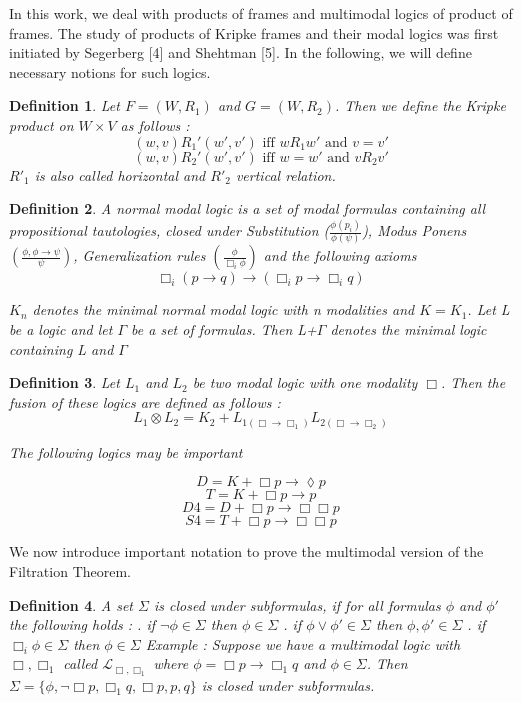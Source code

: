 \documentclass[12pt, a4paper]{scrartcl}
\newtheorem{definition}{Definition}[subsection]
\begin{document}
In this work, we deal with products of frames and multimodal logics of product of frames. The study of products of Kripke frames 
and their modal logics was first initiated by Segerberg [4] and Shehtman [5]. In the following, we will define necessary notions for such logics.

\begin{definition}
    Let $F = (W, R_1)$ and $G = (W,R_2)$. Then we define the Kripke product on $W \times V$ as follows : 
    $$(w,v)R_1'(w',v') \mbox{ iff } wR_1w' \mbox{ and } v = v'$$
    $$(w,v)R_2  '(w',v') \mbox{ iff } w = w' \mbox{ and } vR_2v'$$
    $R'_1$ is also called horizontal and $R'_2$ vertical relation.
\end{definition}

\begin{definition}
A normal modal logic is a set of modal formulas containing all propositional tautologies,
closed under Substitution ($\frac{\phi(p_i)}{\phi(\psi)}$), Modus Ponens 
$(\frac{\phi, \phi \rightarrow \psi}{\psi})$, Generalization rules $(\frac{\phi}{\Box_i \phi})$
and the following axioms 
$$ \Box_i (p \rightarrow q) \rightarrow (\Box_i p \rightarrow \Box_i q)$$

$K_n$ denotes the minimal normal modal logic with n modalities and $K = K_1$.
Let L be a logic and let $\Gamma$ be a set of formulas. Then L+$\Gamma$ denotes 
the minimal logic containing L and $\Gamma$
\end{definition}


\begin{definition}
Let $L_1$ and $L_2$ be two modal logic with one modality $\Box$. Then the fusion of these 
logics are defined as follows :
$$ L_1 \otimes L_2 = K_2 + L_{1(\Box \rightarrow \Box_1)} L_{2(\Box \rightarrow \Box_2)} $$

The following logics may be important 

$$D = K + \Box p \rightarrow \lozenge p$$
$$T = K + \Box p \rightarrow p$$
$$D4 = D + \Box p \rightarrow \Box \Box p$$
$$S4 = T + \Box p \rightarrow \Box \Box p$$   
\end{definition}

We now introduce important notation to prove the multimodal version of the Filtration Theorem.

\begin{definition}
    A set $\Sigma$ is closed under subformulas, if for all formulas $\phi$ and $\phi'$ the following holds :
    \newline {}. if $\neg \phi \in \Sigma$ then $\phi \in \Sigma$
    . if $\phi \lor \phi' \in \Sigma$ then $\phi, \phi' \in \Sigma$
    . if $\Box_i \phi \in \Sigma$ then $\phi \in \Sigma$
    \newline
    \newline
    Example : Suppose we have a multimodal logic with $\Box, \Box_1$ called $\mathcal{L}_{\Box, \Box_1}$ where $\phi = \Box p \rightarrow \Box_1 q$ and $\phi \in \Sigma$. Then $\Sigma = \{ \phi, \neg\Box p, \Box_1 q, \Box p, p, q\}$ is closed under
    subformulas.
\end{definition}
\end{document}
